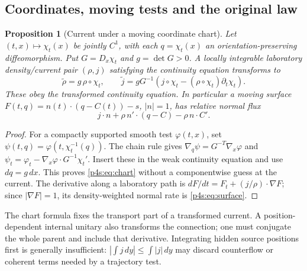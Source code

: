 \documentclass[11pt]{article}
\numberwithin{equation}{section}
\newtheorem{proposition}[theorem]{Proposition}
\theoremstyle{definition}
\theoremstyle{remark}
\begin{document}
\subsection{Coordinates, moving tests and the original law}

\begin{proposition}[Current under a moving coordinate chart]
\label{p4s:prop:chart}
Let $(t,x)\mapsto\chi_t(x)$ be jointly $C^1$, with each
$q=\chi_t(x)$ an orientation-preserving diffeomorphism. Put
$G=D_x\chi_t$ and $g=\det G>0$. A locally integrable laboratory
density/current pair $(\rho,j)$ satisfying the continuity equation
transforms to
\begin{equation}\label{p4s:eq:chart}
 \widetilde\rho=g\,\rho\circ\chi_t,\qquad
 \widetilde j=gG^{-1}
       \left(j\circ\chi_t-(\rho\circ\chi_t)\partial_t\chi_t\right).
\end{equation}
These obey the transformed continuity equation. In particular a moving
surface $F(t,q)=n(t)\cdot(q-C(t))-s$, $|n|=1$, has relative normal flux
\begin{equation}\label{p4s:eq:surface}
 j\cdot n+\rho\,n'\cdot(q-C)-\rho\,n\cdot C'.
\end{equation}
\end{proposition}
\begin{proof}
For a compactly supported smooth test $\varphi(t,x)$, set
$\psi(t,q)=\varphi(t,\chi_t^{-1}(q))$. The chain rule gives
$\nabla_q\psi=G^{-T}\nabla_x\varphi$ and
$\psi_t=\varphi_t-\nabla_x\varphi\cdot G^{-1}\chi_t'$.
Insert these in the weak continuity equation and use $dq=g\,dx$.
This proves \eqref{p4s:eq:chart} without a componentwise guess at the
current. The derivative along a laboratory path is
$dF/dt=F_t+(j/\rho)\cdot\nabla F$; since $|\nabla F|=1$,
its density-weighted normal rate is \eqref{p4s:eq:surface}.
\end{proof}

The chart formula fixes the transport part of a transformed current. A
position-dependent internal unitary also transforms the connection;
one must conjugate the whole parent and include that derivative.
Integrating hidden source positions first is generally insufficient:
$|\int j\,dy|\leq\int|j|\,dy$ may discard counterflow or coherent
terms needed by a trajectory test.
\end{document}

